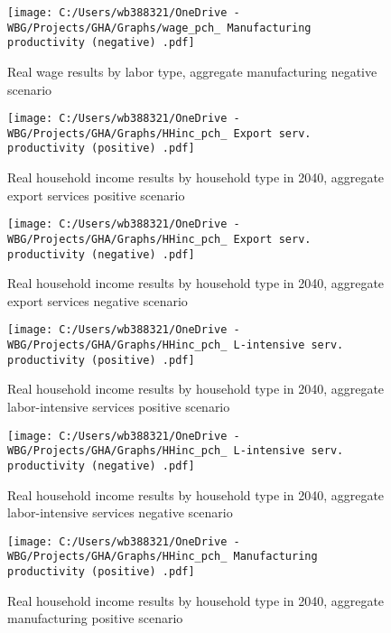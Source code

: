 \documentclass[11pt,english]{article}
\begin{document}
\begin{figure}[ht!]\caption{Real wage results by labor type, aggregate manufacturing negative scenario} \label{fig_AggMNFn_wage_pch}
	\centering
	\texttt{[image: C:/Users/wb388321/OneDrive - WBG/Projects/GHA/Graphs/wage\_pch\_ Manufacturing productivity (negative) .pdf]}
\end{figure}

\clearpage

\begin{figure}[ht!]\caption{Real household income results by household type in 2040, aggregate export services positive scenario} \label{fig_AggSRVhp_HHinc_pch}
	\centering
	\texttt{[image: C:/Users/wb388321/OneDrive - WBG/Projects/GHA/Graphs/HHinc\_pch\_ Export serv. productivity (positive) .pdf]}
\end{figure}

\begin{figure}[ht!]\caption{Real household income results by household type in 2040, aggregate export services negative scenario} \label{fig_AggSRVhn_HHinc_pch}
	\centering
	\texttt{[image: C:/Users/wb388321/OneDrive - WBG/Projects/GHA/Graphs/HHinc\_pch\_ Export serv. productivity (negative) .pdf]}
\end{figure}

\begin{figure}[ht!]\caption{Real household income results by household type in 2040, aggregate labor-intensive services positive scenario} \label{fig_AggSRVlp_HHinc_pch}
	\centering
	\texttt{[image: C:/Users/wb388321/OneDrive - WBG/Projects/GHA/Graphs/HHinc\_pch\_ L-intensive serv. productivity (positive) .pdf]}
\end{figure}

\begin{figure}[ht!]\caption{Real household income results by household type in 2040, aggregate labor-intensive services negative scenario} \label{fig_AggSRVln_HHinc_pch}
	\centering
	\texttt{[image: C:/Users/wb388321/OneDrive - WBG/Projects/GHA/Graphs/HHinc\_pch\_ L-intensive serv. productivity (negative) .pdf]}
\end{figure}

\begin{figure}[ht!]\caption{Real household income results by household type in 2040, aggregate manufacturing positive scenario} \label{fig_AggMNFp_HHinc_pch}
	\centering
	\texttt{[image: C:/Users/wb388321/OneDrive - WBG/Projects/GHA/Graphs/HHinc\_pch\_ Manufacturing productivity (positive) .pdf]}
\end{figure}
\end{document}
